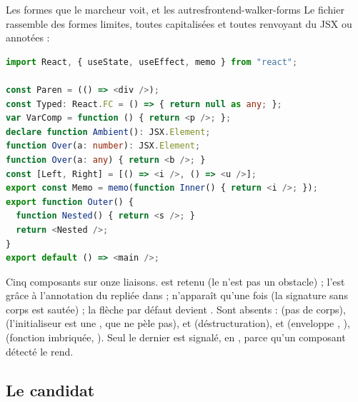 \begin{exemple}{Les formes que le marcheur voit, et les autres}{frontend-walker-forms}
Le fichier  rassemble des formes limites, toutes capitalisées et toutes renvoyant du JSX ou annotées :
\begin{lstlisting}[language=TypeScript,caption={Formes limites du marcheur (\file{/tmp/ch05/walker/A.tsx})}]
import React, { useState, useEffect, memo } from "react";

const Paren = (() => <div />);
const Typed: React.FC = () => { return null as any; };
var VarComp = function () { return <p />; };
declare function Ambient(): JSX.Element;
function Over(a: number): JSX.Element;
function Over(a: any) { return <b />; }
const [Left, Right] = [() => <i />, () => <u />];
export const Memo = memo(function Inner() { return <i />; });
export function Outer() {
  function Nested() { return <s />; }
  return <Nested />;
}
export default () => <main />;
\end{lstlisting}
Cinq composants sur onze liaisons.  est retenu (le  n'est pas un obstacle) ;  l'est grâce à l'annotation du  repliée dans  ;  n'apparaît qu'une fois (la signature sans corps est sautée) ; la flèche par défaut devient . Sont absents :  (pas de corps),  (l'initialiseur est une , que  ne pèle pas),  et  (déstructuration),  et  (enveloppe , ),  (fonction imbriquée, ). Seul le dernier est signalé, en \Info{}, parce qu'un composant détecté le rend.
\end{exemple}

\subsection{Le candidat}

